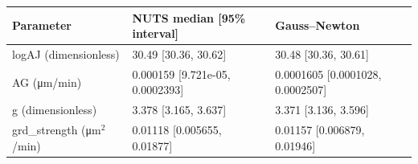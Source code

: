 \begin{tabular}{lll}
Parameter & NUTS median [95\% interval] & Gauss--Newton \\
\hline
logAJ (dimensionless) & 30.49 [30.36, 30.62] & 30.48 [30.36, 30.61] \\
AG (μm/min) & 0.000159 [9.721e-05, 0.0002393] & 0.0001605 [0.0001028, 0.0002507] \\
g (dimensionless) & 3.378 [3.165, 3.637] & 3.371 [3.136, 3.596] \\
grd\_strength (μm$^2$/min) & 0.01118 [0.005655, 0.01877] & 0.01157 [0.006879, 0.01946] \\
\end{tabular}
